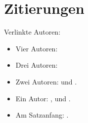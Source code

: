 \documentclass[ngerman]{scrbook}
\begin{document}
\chapter{Zitierungen}
Verlinkte Autoren:

\begin{itemize}
  \item Vier Autoren: \citeauthor{ABCD02} \cite{ABCD02}
  \item Drei Autoren: \citeauthor{ABC01} \cite{ABC01}
  \item Zwei Autoren: \citeauthor{AB00} \cite{AB00} und \citeauthor{vdAW2013} \cite{vdAW2013}.
  \item Ein Autor: \citeauthor{Ez10} \cite{Ez10}, \citeauthor{Go10} \cite{Go10} und \citeauthor{latexcookbook} \cite{latexcookbook}.
  \item Am Satzanfang: .
\end{itemize}

\nocite{*}
\printbibliography
\end{document}
